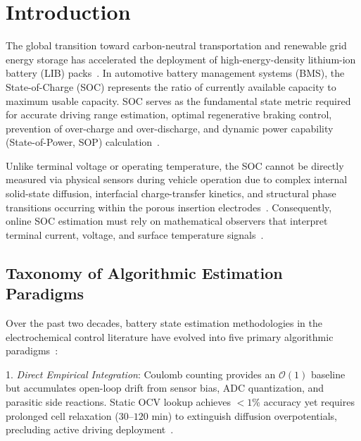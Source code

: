 \documentclass[balance,nocopyright,upint,varvw,hyphenate,barcolor=NavyBlue,nolists]{asmejour}
\begin{document}
\section{Introduction}

The global transition toward carbon-neutral transportation and renewable grid energy storage has accelerated the deployment of high-energy-density lithium-ion battery (LIB) packs~\cite{Tarascon2001,Lu2013review,Mukherjee2024}. In automotive battery management systems (BMS), the State-of-Charge (SOC) represents the ratio of currently available capacity to maximum usable capacity. SOC serves as the fundamental state metric required for accurate driving range estimation, optimal regenerative braking control, prevention of over-charge and over-discharge, and dynamic power capability (State-of-Power, SOP) calculation~\cite{Plett2004part1,Xiong2018joint,Farmann2016peukert}. 

Unlike terminal voltage or operating temperature, the SOC cannot be directly measured via physical sensors during vehicle operation due to complex internal solid-state diffusion, interfacial charge-transfer kinetics, and structural phase transitions occurring within the porous insertion electrodes~\cite{Doyle1993,Torchio2016pybam}. Consequently, online SOC estimation must rely on mathematical observers that interpret terminal current, voltage, and surface temperature signals~\cite{Plett2004part2,Hu2012ecm,Ren2019aging}.

\subsection{Taxonomy of Algorithmic Estimation Paradigms}
Over the past two decades, battery state estimation methodologies in the electrochemical control literature have evolved into five primary algorithmic paradigms~\cite{Xiong2018joint,Hannan2021review}:

1. \emph{Direct Empirical Integration}: Coulomb counting provides an $\mathcal{O}(1)$ baseline~\cite{Plett2004part1} but accumulates open-loop drift from sensor bias, ADC quantization, and parasitic side reactions. Static OCV lookup achieves $<1\%$ accuracy yet requires prolonged cell relaxation ($30\text{--}120\text{ min}$) to extinguish diffusion overpotentials, precluding active driving deployment~\cite{Roscher2011hysteresis,Verbrugge2004hysteresis}.
\end{document}
